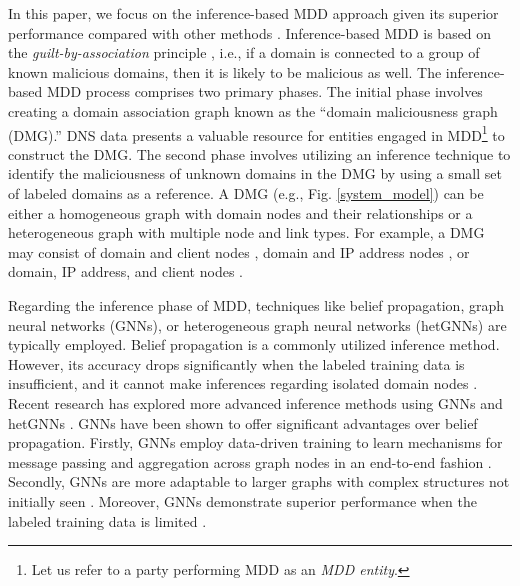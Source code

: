 \documentclass[conference,compsoc]{IEEEtran}
\begin{document}
\par In this paper, we focus on the inference-based MDD approach given its superior performance compared with other methods \cite{sun2019hindom,li2021dydom,zhang2021attributed,li2022heterogeneous}. Inference-based MDD is based on the \textit{guilt-by-association} principle \cite{khalil2018domain,khalil2020method,xia2021identifying}, i.e., if a domain is connected to a group of known malicious domains, then it is likely to be malicious as well. The inference-based MDD process comprises two primary phases. The initial phase involves creating a domain association graph known as the ``domain maliciousness graph (DMG).'' DNS data presents a valuable resource for entities engaged in MDD\footnote{Let us refer to a party performing MDD as an \textit{MDD entity}.} to construct the DMG. The second phase involves utilizing an inference technique to identify the maliciousness of unknown domains in the DMG by using a small set of labeled domains as a reference. A DMG (e.g., Fig. \ref{system_model}) can be either a homogeneous graph with domain nodes and their relationships or a heterogeneous graph with multiple node and link types. For example, a DMG may consist of domain and client nodes \cite{rahbarinia2015segugio, manadhata2014detecting,lee2014gmad}, domain and IP address nodes \cite{khalil2016discovering,khalil2018domain}, or domain, IP address, and client nodes \cite{sun2019hindom,li2021dydom,zhang2021attributed,li2022heterogeneous}. 

\par Regarding the inference phase of MDD, techniques like belief propagation, graph neural networks (GNNs), or heterogeneous graph neural networks (hetGNNs) are typically employed. Belief propagation is a commonly utilized inference method. However, its accuracy drops significantly when the labeled training data is insufficient, and it cannot make inferences regarding isolated domain nodes \cite{satorras2021neural}. Recent research has explored more advanced inference methods using GNNs and hetGNNs \cite{sun2019hindom,sun2020hgdom,nabeel2021method,li2021dydom,zhang2021attributed,li2022heterogeneous}. GNNs have been shown to offer significant advantages over belief propagation. Firstly, GNNs employ data-driven training to learn mechanisms for message passing and aggregation across graph nodes in an end-to-end fashion \cite{zhang2020factor}. Secondly, GNNs are more adaptable to larger graphs with complex structures not initially seen \cite{yoon2019inference}. Moreover, GNNs demonstrate superior performance when the labeled training data is limited \cite{sun2019hindom,li2021dydom,zhang2021attributed,li2022heterogeneous}.
\end{document}
